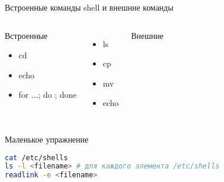 \begin{frame}{Встроенные команды shell и внешние команды}
\begin{columns}
\begin{center}
{\Large Встроенные}
\begin{itemize}
  \item cd
  \item echo
  \item for ...; do ; done
\end{itemize}
\end{center}
\begin{itemize}
  \item ls
  \item cp
  \item mv
  \item echo
\end{itemize}
\begin{center}
{\Large Внешние}
\end{center}
\end{columns}
\end{frame}
\begin{frame}[fragile]{Маленькое упражнение}
\begin{lstlisting}[language=bash]
cat /etc/shells
ls -l <filename> # для каждого элемента /etc/shells
readlink -e <filename> 
\end{lstlisting}
\end{frame}


